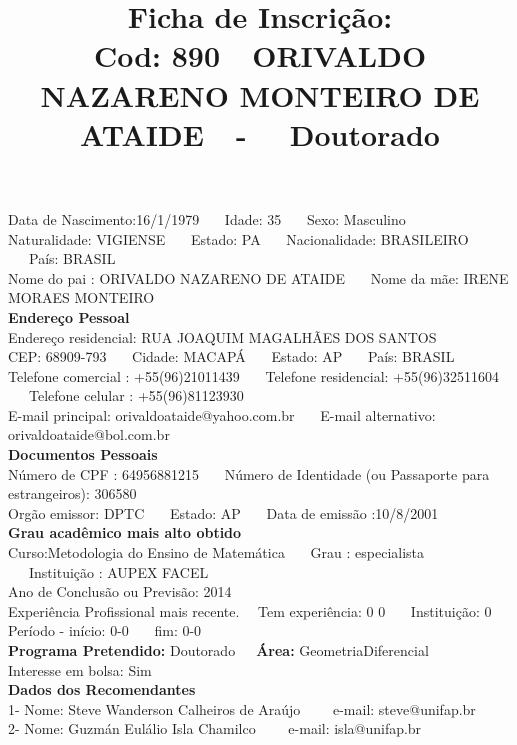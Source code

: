 \documentclass[11pt]{article}
\title{\vspace*{-4cm} Ficha de Inscrição: \\Cod: 890\ \ ORIVALDO NAZARENO MONTEIRO DE ATAIDE\ \ - \ \ Doutorado 
 }
\date{}
\begin{document}
\maketitle
\vspace*{-1.5cm}
\noindent Data de Nascimento:16/1/1979
\ \ \ Idade: 35   \ \ \ Sexo: Masculino
\\
Naturalidade: VIGIENSE  
\ \ \  Estado: PA
\ \ \  Nacionalidade: BRASILEIRO
\ \ \ País: BRASIL
\\        
Nome do pai : ORIVALDO NAZARENO DE ATAIDE
\ \ \ Nome da mãe: IRENE MORAES MONTEIRO          
\\[0.2cm]                     
\textbf{Endereço Pessoal} 
\\ 
\noindent Endereço residencial: RUA JOAQUIM MAGALHÃES DOS SANTOS
\\
        CEP: 68909-793 
\ \ \ Cidade: MACAPÁ 
\ \ \ Estado: AP 
\ \ \ País: BRASIL
\\		
		Telefone comercial : +55(96)21011439
\ \ \ Telefone residencial: +55(96)32511604
\ \ \ Telefone celular : +55(96)81123930
\\
E-mail principal: orivaldoataide@yahoo.com.br
\ \ \ E-mail alternativo: orivaldoataide@bol.com.br 
\\[0.2cm] 
\textbf{Documentos Pessoais}
\\
\noindent Número de CPF : 64956881215
\ \ \ Número de Identidade (ou Passaporte para estrangeiros): 306580
\\
Orgão emissor: DPTC
\ \ \ Estado: AP
\ \ \ Data de emissão :10/8/2001
\\[0.3cm]
\textbf{Grau acadêmico mais alto obtido}
\\	
Curso:Metodologia do Ensino de Matemática
\ \ \ Grau : especialista
\ \ \ Instituição : AUPEX FACEL
\\			
Ano de Conclusão ou Previsão: 2014
\\ 
Experiência Profissional mais recente. \ \  
Tem experiência: 0 0  
\ \ \ Instituição: 0
\\  
Período - início: 0-0
\ \ \ fim: 0-0
\\[0.2cm] 
\textbf{Programa Pretendido:} Doutorado\ \ \ \textbf{Área:} GeometriaDiferencial\\
Interesse em bolsa: Sim
\\[0.3cm]		
\textbf{Dados dos Recomendantes} 
\\
1- Nome: Steve Wanderson Calheiros de Araújo
\ \ \ \  e-mail: steve@unifap.br 
\\
2- Nome: Guzmán Eulálio Isla Chamilco
\ \ \ \ e-mail: isla@unifap.br
\end{document}
